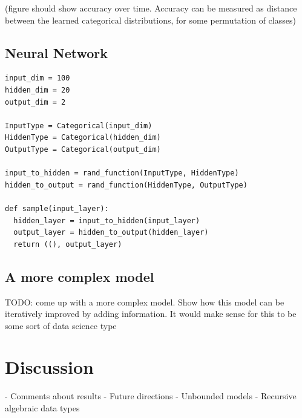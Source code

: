 \documentclass[proceed]{article}
\begin{document}
(figure should show accuracy over time.  Accuracy can be measured as distance between the learned categorical distributions, for some permutation of classes)

\subsection{Neural Network}

\begin{verbatim}
input_dim = 100
hidden_dim = 20
output_dim = 2

InputType = Categorical(input_dim)
HiddenType = Categorical(hidden_dim)
OutputType = Categorical(output_dim)

input_to_hidden = rand_function(InputType, HiddenType)
hidden_to_output = rand_function(HiddenType, OutputType)

def sample(input_layer):
  hidden_layer = input_to_hidden(input_layer)
  output_layer = hidden_to_output(hidden_layer)
  return ((), output_layer)
\end{verbatim}

\subsection{A more complex model}

TODO: come up with a more complex model.  Show how this model can be iteratively improved by adding information.  It would make sense for this to be some sort of data science type  



  \section{Discussion}

  - Comments about results
  - Future directions
    - Unbounded models
    - Recursive algebraic data types
\end{document}
